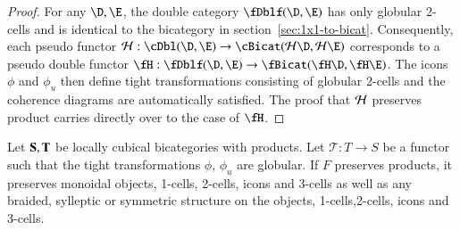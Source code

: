 \begin{proof}
For any $\D, \E$, the double category $\fDblf(\D, \E)$ has only globular 2-cells and is identical to the bicategory in section~\ref{sec:1x1-to-bicat}. Consequently, each pseudo functor $\cH: \cDbl(\D,\E) \rightarrow \cBicat(\cH\D, \cH \E)$ corresponds to a pseudo double functor $\fH: \fDblf(\D,\E) \rightarrow \fBicat(\fH\D, \fH \E)$. The icons $\phi$ and $\phi_u$ then define tight transformations consisting of globular 2-cells and the coherence diagrams are automatically satisfied. The proof that $\mathcal{H}$ preserves product carries directly over to the case of $\fH$.
\end{proof}


 \begin{lem}\label{lem:funcmonob}
  Let ${\bf S,T}$ be locally cubical bicategories with products. Let $\mathcal{T}: T \rightarrow S$ be a functor such that the tight transformations $\phi$, $\phi_u$ are globular. If $F$ preserves products, it preserves  monoidal objects, 1-cells, 2-cells, icons and 3-cells as well as any braided, sylleptic or symmetric structure on the objects, 1-cells,2-cells, icons and 3-cells.
 \end{lem}
 
